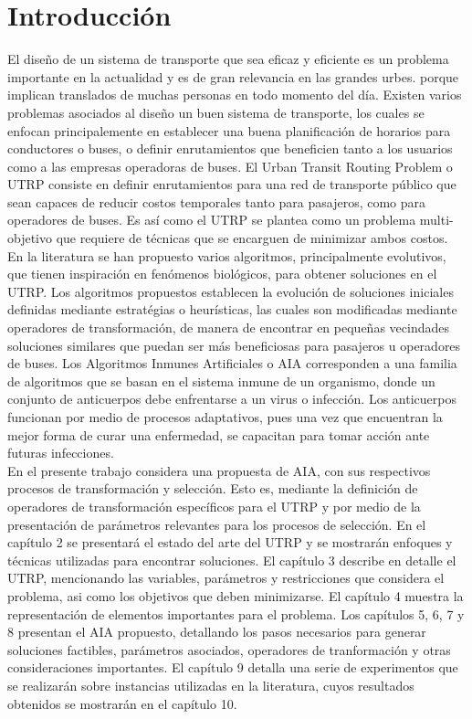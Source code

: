 \section{Introducción}

El diseño de un sistema de transporte que sea eficaz y eficiente es un problema importante en la actualidad y es de gran relevancia en las grandes urbes. porque implican translados de muchas personas en todo momento del día. Existen varios problemas asociados al diseño un buen sistema de transporte, los cuales se enfocan principalemente en establecer una buena planificación de horarios para conductores o buses, o definir enrutamientos que beneficien tanto a los usuarios como a las empresas operadoras de buses. El Urban Transit Routing Problem o UTRP \cite{metaheuristic2010} consiste en definir enrutamientos para una red de transporte público que sean capaces de reducir costos temporales tanto para pasajeros, como para operadores de buses. Es así como el UTRP se plantea como un problema multi-objetivo que requiere de técnicas que se encarguen de minimizar ambos costos.\\

En la literatura \cite{NewHaEOps,john2014improved} se han propuesto varios algoritmos, principalmente evolutivos, que tienen inspiración en fenómenos biológicos, para obtener soluciones en el UTRP. Los algoritmos propuestos establecen la evolución de soluciones iniciales definidas mediante estratégias o heurísticas, las cuales son modificadas mediante operadores de transformación, de manera de encontrar en pequeñas vecindades soluciones similares que puedan ser más beneficiosas para pasajeros u operadores de buses. Los Algoritmos Inmunes Artificiales o AIA \cite{introduction,sia} corresponden a una familia de algoritmos que se basan en el sistema inmune de un organismo, donde un conjunto de anticuerpos debe enfrentarse a un virus o infección. Los anticuerpos funcionan por medio de procesos adaptativos, pues una vez que encuentran la mejor forma de curar una enfermedad, se capacitan para tomar acción ante futuras infecciones.\\

En el presente trabajo considera una propuesta de AIA, con sus respectivos procesos de transformación y selección. Esto es, mediante la definición de operadores de transformación específicos para el UTRP y por medio de la presentación de parámetros relevantes para los procesos de selección. En el capítulo 2 se presentará el estado del arte del UTRP y se mostrarán enfoques y técnicas utilizadas para encontrar soluciones. El capítulo 3 describe en detalle el UTRP, mencionando las variables, parámetros y restricciones que considera el problema, asi como los objetivos que deben minimizarse. El capítulo 4 muestra la representación de elementos importantes para el problema. Los capítulos 5, 6, 7 y 8 presentan el AIA propuesto, detallando los pasos necesarios para generar soluciones factibles, parámetros asociados, operadores de tranformación y otras consideraciones importantes. El capítulo 9 detalla una serie de experimentos que se realizarán sobre instancias utilizadas en la literatura, cuyos resultados obtenidos se mostrarán en el capítulo 10.

